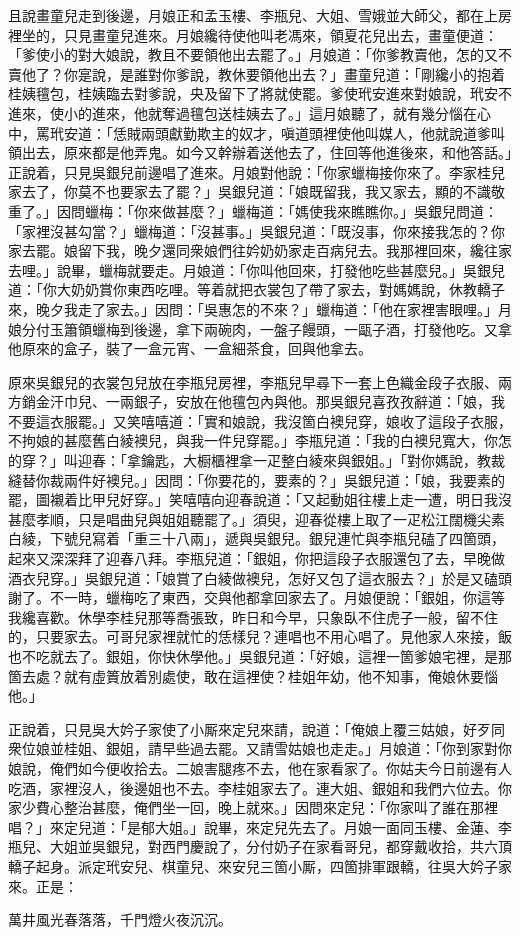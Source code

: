 且說畫童兒走到後邊，月娘正和孟玉樓、李瓶兒、大姐、雪娥並大師父，都在上房裡坐的，只見畫童兒進來。月娘纔待使他叫老馮來，領夏花兒出去，畫童便道：「爹使小的對大娘說，教且不要領他出去罷了。」月娘道：「你爹教賣他，怎的又不賣他了？你寔說，是誰對你爹說，教休要領他出去？」畫童兒道：「剛纔小的抱着桂姨氊包，桂姨臨去對爹說，央及留下了將就使罷。爹使玳安進來對娘說，玳安不進來，使小的進來，他就奪過氊包送桂姨去了。」這月娘聽了，就有幾分惱在心中，罵玳安道：「恁賊兩頭獻勤欺主的奴才，嗔道頭裡使他叫媒人，他就說道爹叫領出去，原來都是他弄鬼。如今又幹辦着送他去了，住回等他進後來，和他答話。」正說着，只見吳銀兒前邊唱了進來。月娘對他說：「你家蠟梅接你來了。李家桂兒家去了，你莫不也要家去了罷？」吳銀兒道：「娘既留我，我又家去，顯的不識敬重了。」因問蠟梅：「你來做甚麼？」蠟梅道：「媽使我來瞧瞧你。」吳銀兒問道：「家裡沒甚勾當？」蠟梅道：「沒甚事。」吳銀兒道：「既沒事，你來接我怎的？你家去罷。娘留下我，晚夕還同衆娘們往妗奶奶家走百病兒去。我那裡回來，纔往家去哩。」說畢，蠟梅就要走。月娘道：「你叫他回來，打發他吃些甚麼兒。」吳銀兒道：「你大奶奶賞你東西吃哩。等着就把衣裳包了帶了家去，對媽媽說，休教轎子來，晚夕我走了家去。」因問：「吳惠怎的不來？」蠟梅道：「他在家裡害眼哩。」月娘分付玉簫領蠟梅到後邊，拿下兩碗肉，一盤子饅頭，一甌子酒，打發他吃。又拿他原來的盒子，裝了一盒元宵、一盒細茶食，回與他拿去。

原來吳銀兒的衣裳包兒放在李瓶兒房裡，李瓶兒早尋下一套上色織金段子衣服、兩方銷金汗巾兒、一兩銀子，安放在他氊包內與他。那吳銀兒喜孜孜辭道：「娘，我不要這衣服罷。」又笑嘻嘻道：「實和娘說，我沒箇白襖兒穿，娘收了這段子衣服，不拘娘的甚麼舊白綾襖兒，與我一件兒穿罷。」李瓶兒道：「我的白襖兒寬大，你怎的穿？」叫迎春：「拿鑰匙，大橱櫃裡拿一疋整白綾來與銀姐。」「對你媽說，教裁縫替你裁兩件好襖兒。」因問：「你要花的，要素的？」吳銀兒道：「娘，我要素的罷，圖襯着比甲兒好穿。」笑嘻嘻向迎春說道：「又起動姐往樓上走一遭，明日我沒甚麼孝順，只是唱曲兒與姐姐聽罷了。」須臾，迎春從樓上取了一疋松江闊機尖素白綾，下號兒寫着「重三十八兩」，遞與吳銀兒。銀兒連忙與李瓶兒磕了四箇頭，起來又深深拜了迎春八拜。李瓶兒道：「銀姐，你把這段子衣服還包了去，早晚做酒衣兒穿。」吳銀兒道：「娘賞了白綾做襖兒，怎好又包了這衣服去？」於是又磕頭謝了。不一時，蠟梅吃了東西，交與他都拿回家去了。月娘便說：「銀姐，你這等我纔喜歡。休學李桂兒那等喬張致，昨日和今早，只象臥不住虎子一般，留不住的，只要家去。可哥兒家裡就忙的恁樣兒？連唱也不用心唱了。見他家人來接，飯也不吃就去了。銀姐，你快休學他。」吳銀兒道：「好娘，這裡一箇爹娘宅裡，是那箇去處？就有虛篢放着別處使，敢在這裡使？桂姐年幼，他不知事，俺娘休要惱他。」{}

正說着，只見吳大妗子家使了小厮來定兒來請，說道：「俺娘上覆三姑娘，好歹同衆位娘並桂姐、銀姐，請早些過去罷。又請雪姑娘也走走。」月娘道：「你到家對你娘說，俺們如今便收拾去。二娘害腿疼不去，他在家看家了。你姑夫今日前邊有人吃酒，家裡沒人，後邊姐也不去。李桂姐家去了。連大姐、銀姐和我們六位去。你家少費心整治甚麼，俺們坐一回，晚上就來。」因問來定兒：「你家叫了誰在那裡唱？」來定兒道：「是郁大姐。」說畢，來定兒先去了。月娘一面同玉樓、金蓮、李瓶兒、大姐並吳銀兒，對西門慶說了，分付奶子在家看哥兒，都穿戴收拾，共六頂轎子起身。派定玳安兒、棋童兒、來安兒三箇小厮，四箇排軍跟轎，往吳大妗子家來。正是：

\begin{myquote}
萬井風光春落落，千門燈火夜沉沉。
\end{myquote}

